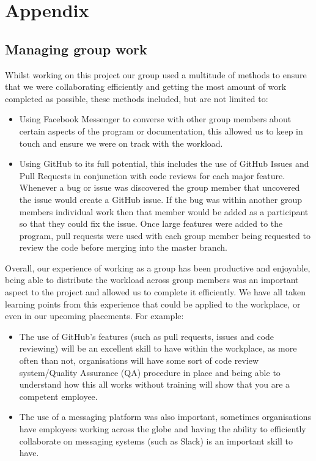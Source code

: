 \documentclass[
  english,
  a4paper,
,tablecaptionabove
]{scrartcl}
\providecommand{\tightlist}{%
  \setlength{\itemsep}{0pt}\setlength{\parskip}{0pt}}
\begin{document}
\newpage

\hypertarget{appendix}{%
\section{Appendix}\label{appendix}}

\hypertarget{managing-group-work}{%
\subsection{Managing group work}\label{managing-group-work}}

Whilst working on this project our group used a multitude of methods to
ensure that we were collaborating efficiently and getting the most
amount of work completed as possible, these methods included, but are
not limited to:

\begin{itemize}
\tightlist
\item
  Using Facebook Messenger to converse with other group members about
  certain aspects of the program or documentation, this allowed us to
  keep in touch and ensure we were on track with the workload.
\item
  Using GitHub to its full potential, this includes the use of GitHub
  Issues and Pull Requests in conjunction with code reviews for each
  major feature. Whenever a bug or issue was discovered the group member
  that uncovered the issue would create a GitHub issue. If the bug was
  within another group members individual work then that member would be
  added as a participant so that they could fix the issue. Once large
  features were added to the program, pull requests were used with each
  group member being requested to review the code before merging into
  the master branch.
\end{itemize}

Overall, our experience of working as a group has been productive and
enjoyable, being able to distribute the workload across group members
was an important aspect to the project and allowed us to complete it
efficiently. We have all taken learning points from this experience that
could be applied to the workplace, or even in our upcoming placements.
For example:

\begin{itemize}
\tightlist
\item
  The use of GitHub's features (such as pull requests, issues and code
  reviewing) will be an excellent skill to have within the workplace, as
  more often than not, organisations will have some sort of code review
  system/Quality Assurance (QA) procedure in place and being able to
  understand how this all works without training will show that you are
  a competent employee.
\item
  The use of a messaging platform was also important, sometimes
  organisations have employees working across the globe and having the
  ability to efficiently collaborate on messaging systems (such as
  Slack) is an important skill to have.
\end{itemize}
\end{document}
